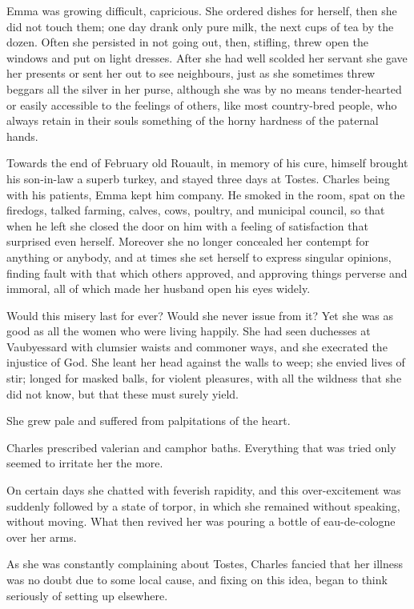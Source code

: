 \documentclass[11pt,twocolumn]{ltugboat}
\begin{document}
Emma was growing difficult, capricious. She ordered dishes for herself,
then she did not touch them; one day drank only pure milk, the next
cups of tea by the dozen. Often she persisted in not going out, then,
stifling, threw open the windows and put on light dresses. After she had
well scolded her servant she gave her presents or sent her out to see
neighbours, just as she sometimes threw beggars all the silver in her
purse, although she was by no means tender-hearted or easily accessible
to the feelings of others, like most country-bred people, who always
retain in their souls something of the horny hardness of the paternal
hands.

Towards the end of February old Rouault, in memory of his cure, himself
brought his son-in-law a superb turkey, and stayed three days at Tostes.
Charles being with his patients, Emma kept him company. He smoked in the
room, spat on the firedogs, talked farming, calves, cows, poultry, and
municipal council, so that when he left she closed the door on him with
a feeling of satisfaction that surprised even herself. Moreover she no
longer concealed her contempt for anything or anybody, and at times she
set herself to express singular opinions, finding fault with that which
others approved, and approving things perverse and immoral, all of which
made her husband open his eyes widely.

Would this misery last for ever? Would she never issue from it? Yet
she was as good as all the women who were living happily. She had seen
duchesses at Vaubyessard with clumsier waists and commoner ways, and she
execrated the injustice of God. She leant her head against the walls
to weep; she envied lives of stir; longed for masked balls, for violent
pleasures, with all the wildness that she did not know, but that these
must surely yield.

She grew pale and suffered from palpitations of the heart.

Charles prescribed valerian and camphor baths. Everything that was tried
only seemed to irritate her the more.

On certain days she chatted with feverish rapidity, and this
over-excitement was suddenly followed by a state of torpor, in which
she remained without speaking, without moving. What then revived her was
pouring a bottle of eau-de-cologne over her arms.

As she was constantly complaining about Tostes, Charles fancied that her
illness was no doubt due to some local cause, and fixing on this idea,
began to think seriously of setting up elsewhere.
\end{document}
